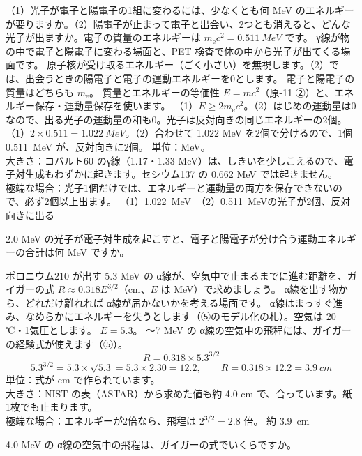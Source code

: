 \label{ph:原-13:ex6}
\begin{phreidai}
（1）光子が電子と陽電子の1組に変わるには、少なくとも何 MeV のエネルギーが要りますか。（2）陽電子が止まって電子と出会い、2つとも消えると、どんな光子が出ますか。電子の質量のエネルギーは $m_{\mathrm e}c^2=\qty{0.511}{MeV}$ です。
\phbamen
γ線が物の中で電子と陽電子に変わる場面と、PET 検査で体の中から光子が出てくる場面です。
\phmushi
原子核が受け取るエネルギー（ごく小さい）を無視します。（2）では、出会うときの陽電子と電子の運動エネルギーを0とします。
\phzu
電子と陽電子の質量はどちらも $m_{\mathrm e}$。
\phriyu
質量とエネルギーの等価性 $E=mc^2$（原-11 ②）と、エネルギー保存・運動量保存を使います。
\phtateru
（1）$E\ge2m_{\mathrm e}c^2$。（2）はじめの運動量は0なので、出る光子の運動量の和も0。光子は反対向きの同じエネルギーの2個。
\phtoku
（1）$2\times0.511=\qty{1.022}{MeV}$。（2）合わせて 1.022 MeV を2個で分けるので、1個 \qty{0.511}{MeV} が、反対向きに2個。
\phtashikame
単位：MeV。\\
大きさ：コバルト60 のγ線（1.17・1.33 MeV）は、しきいを少しこえるので、電子対生成もわずかに起きます。セシウム137 の 0.662 MeV では起きません。\\
極端な場合：光子1個だけでは、エネルギーと運動量の両方を保存できないので、必ず2個以上出ます。
\kotae （1）\qty{1.022}{MeV}　（2）\qty{0.511}{MeV}の光子が2個、反対向きに出る
\end{phreidai}
\begin{jibun}
2.0 MeV の光子が電子対生成を起こすと、電子と陽電子が分け合う運動エネルギーの合計は何 MeV ですか。
\end{jibun}

\label{ph:原-13:ex7}
\begin{phreidai}[α線は空気中でどこまで飛ぶか]
ポロニウム210 が出す 5.3 MeV の α線が、空気中で止まるまでに進む距離を、ガイガーの式 $R\approx0.318E^{3/2}$（cm、$E$ は MeV）で求めましょう。
\phbamen
α線を出す物から、どれだけ離れれば α線が届かないかを考える場面です。
\phmushi
α線はまっすぐ進み、なめらかにエネルギーを失うとします（⑤のモデル化の札）。空気は 20 ℃・1気圧とします。
\phzu
$E=5.3$。
〜7 MeV の α線の空気中の飛程には、ガイガーの経験式が使えます（⑤）。
\phtateru
\[ R=0.318\times5.3^{3/2} \]
\phtoku
\[ 5.3^{3/2}=5.3\times\sqrt{5.3}=5.3\times2.30=12.2,\qquad R=0.318\times12.2=\qty{3.9}{cm} \]
\phtashikame
単位：式が cm で作られています。\\
大きさ：NIST の表（ASTAR）から求めた値も約 4.0 cm で、合っています。紙1枚でも止まります。\\
極端な場合：エネルギーが2倍なら、飛程は $2^{3/2}=2.8$ 倍。
\kotae 約 \qty{3.9}{cm}
\end{phreidai}
\begin{jibun}
4.0 MeV の α線の空気中の飛程は、ガイガーの式でいくらですか。
\end{jibun}

